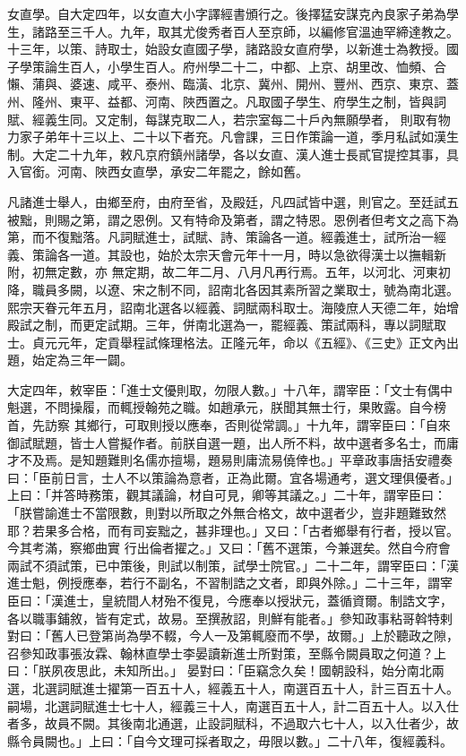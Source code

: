 \begin{pinyinscope}
 女直學。自大定四年，以女直大小字譯經書頒行之。後擇猛安謀克內良家子弟為學生，諸路至三千人。九年，取其尤俊秀者百人至京師，以編修官溫迪罕締達教之。十三年，以策、詩取士，始設女直國子學，諸路設女直府學，以新進士為教授。國子學策論生百人，小學生百人。府州學二十二，中都、上京、胡里改、恤頻、合懶、蒲與、婆速、咸平、泰州、臨潢、北京、冀州、開州、豐州、西京、東京、蓋州、隆州、東平、益都、河南、陜西置之。凡取國子學生、府學生之制，皆與詞賦、經義生同。又定制，每謀克取二人，若宗室每二十戶內無願學者，
 則取有物力家子弟年十三以上、二十以下者充。凡會課，三日作策論一道，季月私試如漢生制。大定二十九年，敕凡京府鎮州諸學，各以女直、漢人進士長貳官提控其事，具入官銜。河南、陜西女直學，承安二年罷之，餘如舊。



 凡諸進士舉人，由鄉至府，由府至省，及殿廷，凡四試皆中選，則官之。至廷試五被黜，則賜之第，謂之恩例。又有特命及第者，謂之特恩。恩例者但考文之高下為第，而不復黜落。凡詞賦進士，試賦、詩、策論各一道。經義進士，試所治一經義、策論各一道。其設也，始於太宗天會元年十一月，時以急欲得漢士以撫輯新附，初無定數，亦
 無定期，故二年二月、八月凡再行焉。五年，以河北、河東初降，職員多闕，以遼、宋之制不同，詔南北各因其素所習之業取士，號為南北選。熙宗天眷元年五月，詔南北選各以經義、詞賦兩科取士。海陵庶人天德二年，始增殿試之制，而更定試期。三年，併南北選為一，罷經義、策試兩科，專以詞賦取士。貞元元年，定貢舉程試條理格法。正隆元年，命以《五經》、《三史》正文內出題，始定為三年一闢。



 大定四年，敕宰臣：「進士文優則取，勿限人數。」十八年，謂宰臣：「文士有偶中魁選，不問操履，而輒授翰苑之職。如趙承元，朕聞其無士行，果敗露。自今榜首，先訪察
 其鄉行，可取則授以應奉，否則從常調。」十九年，謂宰臣曰：「自來御試賦題，皆士人嘗擬作者。前朕自選一題，出人所不料，故中選者多名士，而庸才不及焉。是知題難則名儒亦擅場，題易則庸流易僥倖也。」平章政事唐括安禮奏曰：「臣前日言，士人不以策論為意者，正為此爾。宜各場通考，選文理俱優者。」上曰：「并答時務策，觀其議論，材自可見，卿等其議之。」二十年，謂宰臣曰：「朕嘗諭進士不當限數，則對以所取之外無合格文，故中選者少，豈非題難致然耶？若果多合格，而有司妄黜之，甚非理也。」又曰：「古者鄉舉有行者，授以官。今其考滿，察鄉曲實
 行出倫者擢之。」又曰：「舊不選策，今兼選矣。然自今府會兩試不須試策，已中策後，則試以制策，試學士院官。」二十二年，謂宰臣曰：「漢進士魁，例授應奉，若行不副名，不習制誥之文者，即與外除。」二十三年，謂宰臣曰：「漢進士，皇統間人材殆不復見，今應奉以授狀元，蓋循資爾。制誥文字，各以職事鋪敘，皆有定式，故易。至撰赦詔，則鮮有能者。」參知政事粘哥斡特剌對曰：「舊人已登第尚為學不輟，今人一及第輒廢而不學，故爾。」上於聽政之隙，召參知政事張汝霖、翰林直學士李晏讀新進士所對策，至縣令闕員取之何道？上曰：「朕夙夜思此，未知所出。」
 晏對曰：「臣竊念久矣！國朝設科，始分南北兩選，北選詞賦進士擢第一百五十人，經義五十人，南選百五十人，計三百五十人。嗣場，北選詞賦進士七十人，經義三十人，南選百五十人，計二百五十人。以入仕者多，故員不闕。其後南北通選，止設詞賦科，不過取六七十人，以入仕者少，故縣令員闕也。」上曰：「自今文理可採者取之，毋限以數。」二十八年，復經義科。




\end{pinyinscope}
